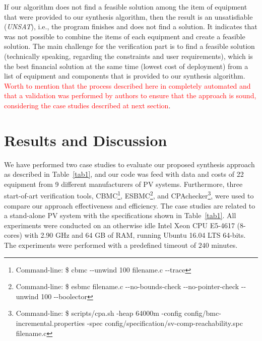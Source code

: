 \documentclass[10pt,conference]{IEEEtran}
\begin{document}
If our algorithm does not find a feasible solution among the item of equipment that were provided to our synthesis algorithm, then the result is an unsatisfiable (\textit{UNSAT}), i.e., the program finishes and does not find a solution. It indicates that was not possible to combine the items of each equipment and create a feasible solution. The main challenge for the verification part is to find a feasible solution (technically speaking, regarding the constraints and user requirements), which is the best financial solution at the same time (lowest cost of deployment) from a list of equipment and components that is provided to our synthesis algorithm. \textcolor{red}{Worth to mention that the process described here in completely automated and that a validation was performed by authors to ensure that the approach is sound, considering the case studies described at next section}.
\section{Results and Discussion}
We have performed two case studies to evaluate our proposed synthesis approach as described in Table~\ref{tab1}, and our code was feed with data and costs of 22 equipment from 9 different manufacturers of PV systems. Furthermore, three start-of-art verification tools, CBMC\footnote{Command-line: \$ cbmc -\phantom{}-unwind 100 filename.c -\phantom{}-trace}, ESBMC\footnote{Command-line: \$ esbmc filename.c -\phantom{}-no-bounds-check -\phantom{}-no-pointer-check -\phantom{}-unwind 100 -\phantom{}-boolector}, %
and CPAchecker\footnote{Command-line: \$ scripts/cpa.sh -heap 64000m -config config/bmc-incremental.properties -spec config/specification/sv-comp-reachability.spc filename.c}, were used to compare our approach effectiveness and efficiency. The case studies are related to a stand-alone PV system with the specifications shown in Table~\ref{tab1}. All experiments were conducted on an otherwise idle Intel Xeon CPU E5-4617 (8-cores) with 2.90 GHz and 64 GB of RAM, running Ubuntu 16.04 LTS 64-bits. The experiments were performed with a predefined timeout of $240$ minutes.
\end{document}
